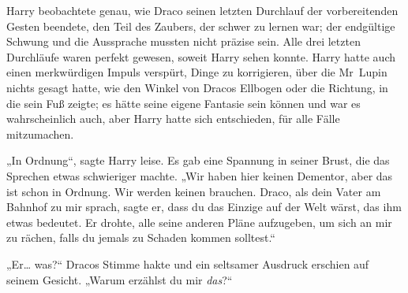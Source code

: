 \later

Harry beobachtete genau, wie Draco seinen letzten Durchlauf der vorbereitenden Gesten beendete, den Teil des Zaubers, der schwer zu lernen war; der endgültige Schwung und die Aussprache mussten nicht präzise sein. Alle drei letzten Durchläufe waren perfekt gewesen, soweit Harry sehen konnte. Harry hatte auch einen merkwürdigen Impuls verspürt, Dinge zu korrigieren, über die Mr~Lupin nichts gesagt hatte, wie den Winkel von Dracos Ellbogen oder die Richtung, in die sein Fuß zeigte; es hätte seine eigene Fantasie sein können und war es wahrscheinlich auch, aber Harry hatte sich entschieden, für alle Fälle mitzumachen.

„In Ordnung“, sagte Harry leise. Es gab eine Spannung in seiner Brust, die das Sprechen etwas schwieriger machte. „Wir haben hier keinen Dementor, aber das ist schon in Ordnung. Wir werden keinen brauchen. Draco, als dein Vater am Bahnhof zu mir sprach, sagte er, dass du das Einzige auf der Welt wärst, das ihm etwas bedeutet. Er drohte, alle seine anderen Pläne aufzugeben, um sich an mir zu rächen, falls du jemals zu Schaden kommen solltest.“

„Er… was?“ Dracos Stimme hakte und ein seltsamer Ausdruck erschien auf seinem Gesicht. „Warum erzählst du mir \emph{das}?“

